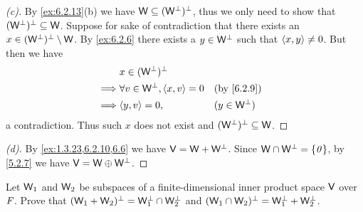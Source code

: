 \begin{proof}[(c)]
  By \cref{ex:6.2.13}(b) we have \(\mathsf{W} \subseteq (\mathsf{W}^{\perp})^{\perp}\), thus we only need to show that \((\mathsf{W}^{\perp})^{\perp} \subseteq \mathsf{W}\).
  Suppose for sake of contradiction that there exists an \(x \in (\mathsf{W}^{\perp})^{\perp} \setminus \mathsf{W}\).
  By \cref{ex:6.2.6} there exists a \(y \in \mathsf{W}^{\perp}\) such that \(\left\langle x, y\right\rangle \neq 0\).
  But then we have
  \begin{align*}
             & x \in (\W^{\perp})^{\perp}                                       \\
    \implies & \forall v \in \W^{\perp}, \inn{x, v} = 0 &  & \by{6.2.9}         \\
    \implies & \inn{y, v} = 0,                          &  & (y \in \W^{\perp})
  \end{align*}
  a contradiction.
  Thus such \(x\) does not exist and \((\mathsf{W}^{\perp})^{\perp} \subseteq \mathsf{W}\).
\end{proof}

\begin{proof}[(d)]
  By \cref{ex:1.3.23,6.2.10,6.6} we have \(\mathsf{V} = \mathsf{W} + \mathsf{W}^{\perp}\).
  Since \(\mathsf{W} \cap \mathsf{W}^{\perp} = \left\lbrace\mathit{0}\right\rbrace\), by \cref{5.2.7} we have \(\mathsf{V} = \mathsf{W} \oplus \mathsf{W}^{\perp}\).
\end{proof}

\begin{ex}\label{ex:6.2.14}
  Let \(\mathsf{W}_1\) and \(\mathsf{W}_2\) be subspaces of a finite-dimensional inner product space \(\mathsf{V}\) over \(\mathit{F}\).
  Prove that \((\mathsf{W}_1 + \mathsf{W}_2)^{\perp} = \mathsf{W}_1^{\perp} \cap \mathsf{W}_2^{\perp}\) and \((\mathsf{W}_1 \cap \mathsf{W}_2)^{\perp} = \mathsf{W}_1^{\perp} + \mathsf{W}_2^{\perp}\).
\end{ex}

